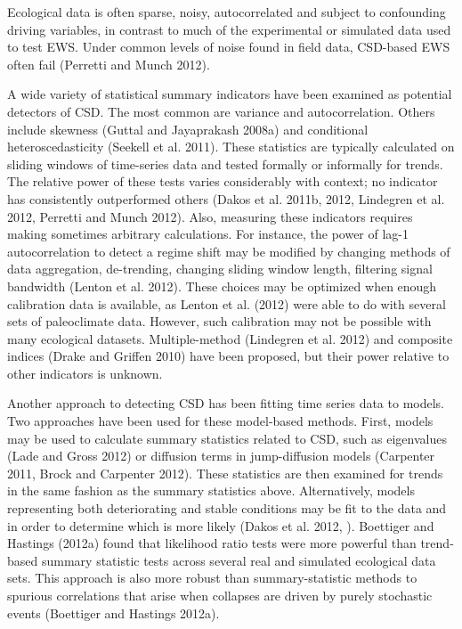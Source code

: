 \documentclass{article}
\begin{document}
Ecological data is often sparse, noisy, autocorrelated and subject to
confounding driving variables, in contrast to much of the experimental
or simulated data used to test EWS. Under common levels of noise found
in field data, CSD-based EWS often fail (Perretti and Munch 2012).

A wide variety of statistical summary indicators have been examined as
potential detectors of CSD. The most common are variance and
autocorrelation. Others include skewness (Guttal and Jayaprakash 2008a)
and conditional heteroscedasticity (Seekell et al. 2011). These
statistics are typically calculated on sliding windows of time-series
data and tested formally or informally for trends. The relative power of
these tests varies considerably with context; no indicator has
consistently outperformed others (Dakos et al. 2011b, 2012, Lindegren et
al. 2012, Perretti and Munch 2012). Also, measuring these indicators
requires making sometimes arbitrary calculations. For instance, the
power of lag-1 autocorrelation to detect a regime shift may be modified
by changing methods of data aggregation, de-trending, changing sliding
window length, filtering signal bandwidth (Lenton et al. 2012). These
choices may be optimized when enough calibration data is available, as
Lenton et al. (2012) were able to do with several sets of paleoclimate
data. However, such calibration may not be possible with many ecological
datasets. Multiple-method (Lindegren et al. 2012) and composite indices
(Drake and Griffen 2010) have been proposed, but their power relative to
other indicators is unknown.

Another approach to detecting CSD has been fitting time series data to
models. Two approaches have been used for these model-based methods.
First, models may be used to calculate summary statistics related to
CSD, such as eigenvalues (Lade and Gross 2012) or diffusion terms in
jump-diffusion models (Carpenter 2011, Brock and Carpenter 2012). These
statistics are then examined for trends in the same fashion as the
summary statistics above. Alternatively, models representing both
deteriorating and stable conditions may be fit to the data and in order
to determine which is more likely (Dakos et al. 2012, ). Boettiger and
Hastings (2012a) found that likelihood ratio tests were more powerful
than trend-based summary statistic tests across several real and
simulated ecological data sets. This approach is also more robust than
summary-statistic methods to spurious correlations that arise when
collapses are driven by purely stochastic events (Boettiger and Hastings
2012a).
\end{document}
